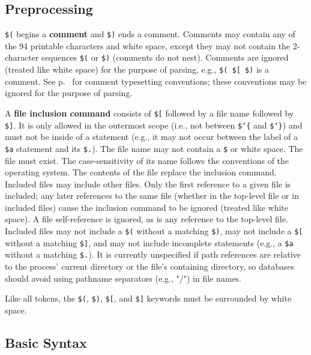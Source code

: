 \subsection{Preprocessing}

\texttt{\$(} begins a {\bf comment} and \texttt{\$)} ends a comment.  Comments may contain any of
the 94 printable characters and white space, except they may not contain the
2-character sequences \texttt{\$(} or \texttt{\$)} (comments do not nest).  Comments are ignored (treated
like white space) for the purpose of parsing, e.g.,
\texttt{\$( \$[ \$)} is a comment.
See p.~\pageref{mathcomments} for comment typesetting conventions; these
conventions may be ignored for the purpose of parsing.

A {\bf file inclusion command} consists of \texttt{\$[} followed by a file name
followed by \texttt{\$]}.
It is only allowed in the outermost scope (i.e., not between 
\texttt{\$\char`\{} and \texttt{\$\char`\}})
and must not be inside of a statement (e.g., it may not occur
between the label of a \texttt{\$a} statement and its \texttt{\$.}).
The file name may not
contain a \texttt{\$} or white space.  The file must exist.
The case-sensitivity
of its name follows the conventions of the operating system.  The contents of
the file replace the inclusion command.
Included files may include other files.
Only the first reference to a given file is included; any later
references to the same file (whether in the top-level file or in included
files) cause the inclusion command to be ignored (treated like white space).
A file self-reference is ignored, as is any reference to the top-level file.
Included files may not include a \texttt{\$(} without a matching \texttt{\$)},
may not include a \texttt{\$[} without a matching \texttt{\$]}, and may
not include incomplete statements (e.g., a \texttt{\$a} without a matching
\texttt{\$.}).
It is currently unspecified if path references are relative to the process'
current directory or the file's containing directory, so databases should
avoid using pathname separators (e.g., "/") in file names.

Like all tokens, the \texttt{\$(}, \texttt{\$)}, \texttt{\$[}, and \texttt{\$]} keywords
must be surrounded by white space.

\subsection{Basic Syntax}

